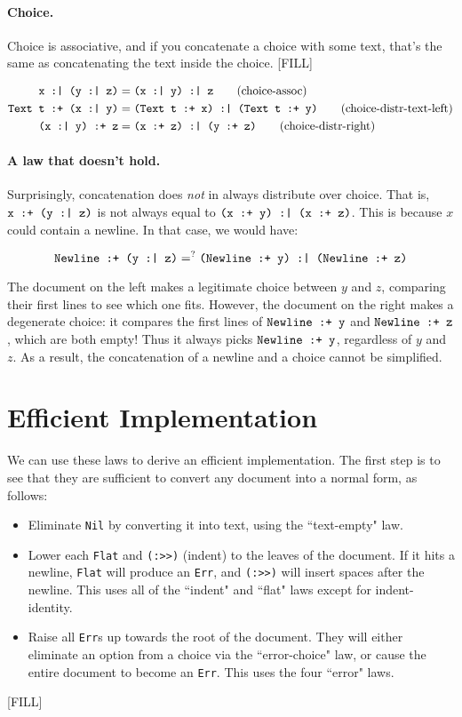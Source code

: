 \documentclass{article}
\newcommand{\cat}[2]{\texttt{#1 :+ #2}}
\newcommand{\choice}[2]{\texttt{#1 :| #2}}
\newcommand{\txt}[1]{\texttt{Text #1}}
\newcommand{\nl}{\texttt{Newline}}
\newcommand{\code}[1]{\texttt{#1}}
\begin{document}
\paragraph{Choice.}
Choice is associative, and if you concatenate a choice with some text, that's the same as
concatenating the text inside the choice. [FILL]

\begin{align*}
  \choice{x}{(\choice{y}{z})} &= \choice{(\choice{x}{y})}{z}
    \tag{choice-assoc} \\
  \cat{\txt{t}}{(\choice{x}{y})} &= \choice{(\cat{\txt{t}}{x})}{(\cat{\txt{t}}{y})}
    \tag{choice-distr-text-left} \\
  \cat{(\choice{x}{y})}{z} &= \choice{(\cat{x}{z})}{(\cat{y}{z})}
    \tag{choice-distr-right}
\end{align*}

\paragraph{A law that doesn't hold.}
Surprisingly, concatenation does \emph{not} in always distribute over choice. That is,
$\cat{x}{(\choice{y}{z})}$ is not always equal to $\choice{(\cat{x}{y})}{(\cat{x}{z})}$.  This is
because $x$ could contain a newline. In that case, we would have:

\[ \cat{\nl}{(\choice{y}{z})} =^? \choice{(\cat{\nl}{y})}{(\cat{\nl}{z})} \]

The document on the left makes a legitimate choice between $y$ and $z$, comparing their first lines
to see which one fits. However, the document on the right makes a degenerate choice: it compares the
first lines of $\cat{\nl}{y}$ and $\cat{\nl}{z}$, which are both empty! Thus it always picks
$\cat{\nl}{y}$, regardless of $y$ and $z$.  As a result, the concatenation of a newline and a choice
cannot be simplified.

\section{Efficient Implementation}

We can use these laws to derive an efficient implementation. The first step is to see that they are
sufficient to convert any document into a normal form, as follows:

\begin{itemize}
\item Eliminate \code{Nil} by converting it into text, using the ``text-empty" law.
\item Lower each \code{Flat} and \code{(:>>)} (indent) to the leaves of the document. If it hits a
newline, \code{Flat} will produce an \code{Err}, and \code{(:>>)} will insert spaces after the
newline. This uses all of the ``indent" and ``flat" laws except for indent-identity.
\item Raise all \code{Err}s up towards the root of the document. They will either eliminate an
option from a choice via the ``error-choice" law, or cause the entire document to become an
\code{Err}. This uses the four ``error" laws.
\end{itemize}

[FILL]
\end{document}
